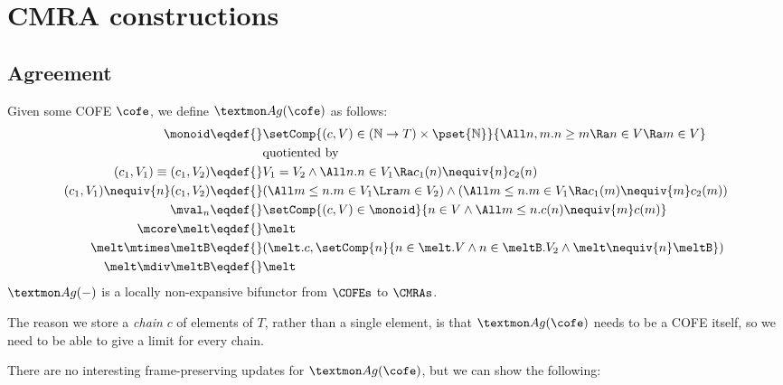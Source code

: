 
\section{CMRA constructions}

\subsection{Agreement}

Given some COFE $\cofe$, we define $\agm(\cofe)$ as follows:
\begin{align*}
  \monoid \eqdef{}& \setComp{(c, V) \in (\mathbb{N} \to T) \times \pset{\mathbb{N}}}{ \All n, m. n \geq m \Ra n \in V \Ra m \in V  } \\
  & \text{quotiented by} \\
  (c_1, V_1) \equiv (c_1, V_2) \eqdef{}& V_1 = V_2 \land \All n. n \in V_1 \Ra c_1(n) \nequiv{n} c_2(n) \\
  (c_1, V_1) \nequiv{n} (c_1, V_2) \eqdef{}& (\All m \leq n. m \in V_1 \Lra m \in V_2) \land (\All m \leq n. m \in V_1 \Ra c_1(m) \nequiv{m} c_2(m)) \\
  \mval_n \eqdef{}& \setComp{(c, V) \in \monoid}{ n \in V \land \All m \leq n. c(n) \nequiv{m} c(m) } \\
  \mcore\melt \eqdef{}& \melt \\
  \melt \mtimes \meltB \eqdef{}& (\melt.c, \setComp{n}{n \in \melt.V \land n \in \meltB.V_2 \land \melt \nequiv{n} \meltB }) \\
  \melt \mdiv \meltB \eqdef{}& \melt \\
\end{align*}
$\agm(-)$ is a locally non-expansive bifunctor from $\COFEs$ to $\CMRAs$.

The reason we store a \emph{chain} $c$ of elements of $T$, rather than a single element, is that $\agm(\cofe)$ needs to be a COFE itself, so we need to be able to give a limit for every chain.

There are no interesting frame-preserving updates for $\agm(\cofe)$, but we can show the following:




